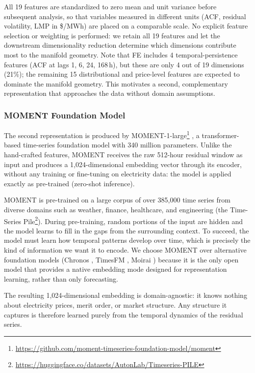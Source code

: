 \documentclass[12pt]{article}
\begin{document}
All 19 features are standardized to zero mean and unit variance before subsequent analysis, so that variables measured in different units (ACF, residual volatility, LMP in \$/MWh) are placed on a comparable scale.
No explicit feature selection or weighting is performed: we retain all 19 features and let the downstream dimensionality reduction determine which dimensions contribute most to the manifold geometry.
Note that FE includes 4 temporal-persistence features (ACF at lags 1, 6, 24, 168\,h), but these are only 4 out of 19 dimensions (21\%); the remaining 15 distributional and price-level features are expected to dominate the manifold geometry.
This motivates a second, complementary representation that approaches the data without domain assumptions.

\subsubsection{MOMENT Foundation Model}
\label{sec:repr_moment}

The second representation is produced by MOMENT-1-large\footnote{\url{https://github.com/moment-timeseries-foundation-model/moment}} \citep{moment2024}, a transformer-based time-series foundation model with 340 million parameters.
Unlike the hand-crafted features, MOMENT receives the raw 512-hour residual window as input and produces a 1,024-dimensional embedding vector through its encoder, without any training or fine-tuning on electricity data: the model is applied exactly as pre-trained (zero-shot inference).

MOMENT is pre-trained on a large corpus of over 385,000 time series from diverse domains such as weather, finance, healthcare, and engineering (the Time-Series Pile\footnote{\url{https://huggingface.co/datasets/AutonLab/Timeseries-PILE}}).
During pre-training, random portions of the input are hidden and the model learns to fill in the gaps from the surrounding context.
To succeed, the model must learn how temporal patterns develop over time, which is precisely the kind of information we want it to encode.
We choose MOMENT over alternative foundation models (Chronos \citep{chronos2024}, TimesFM \citep{timesfm2024}, Moirai \citep{woo2024}) because it is the only open model that provides a native embedding mode designed for representation learning, rather than only forecasting.

The resulting 1,024-dimensional embedding is domain-agnostic: it knows nothing about electricity prices, merit order, or market structure.
Any structure it captures is therefore learned purely from the temporal dynamics of the residual series.
\end{document}
